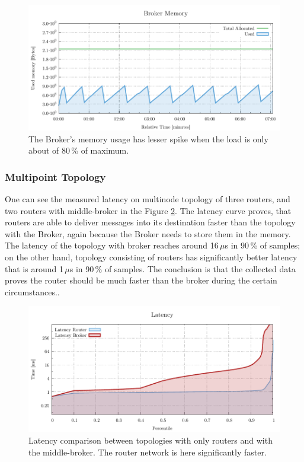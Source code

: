 \begin{figure}[H]
	\centering
	\includegraphics[width=1\linewidth]{obrazky-figures/charts/singlepoint-broker-latency-memory.pdf}
	\caption{The Broker's memory usage has lesser spike when the load is only about of 80\,\% of maximum.}
	\label{fig:latency-single-broker-memory}
\end{figure}

\subsubsection*{Multipoint Topology}
One can see the measured latency on multinode topology of three routers, and two routers with middle-broker in the Figure \ref{fig:latency-multipoint-router}. The latency curve proves, that routers are able to deliver messages into its destination faster than the topology with the Broker, again because the Broker needs to store them in the memory. The latency of the topology with broker reaches around 16\,$\mu$s in 90\,\% of samples; on the other hand, topology consisting of routers has significantly better latency that is around 1\,$\mu$s in 90\,\% of samples. The conclusion is that the collected data proves the router should be much faster than the broker during the certain circumstances..

\begin{figure}[H]
	\centering
	\includegraphics[width=1\linewidth]{obrazky-figures/charts/multipoint-latency.pdf}
	\caption{Latency comparison between topologies with only routers and with the middle-broker. The router network is here significantly faster.}
	\label{fig:latency-multipoint-router}
\end{figure}

